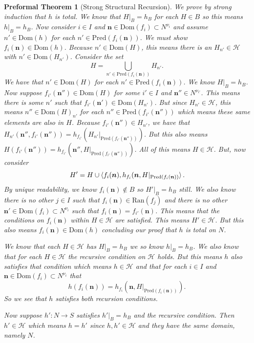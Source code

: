 \documentclass[oneside, 12pt]{book}
\theoremstyle{break}
\newtheorem{preformal definition}[definition]{Preformal Definition}
\newtheorem{preformal theorem}[theorem]{Preformal Theorem}
\newcommand{\bv}[1]{\boldsymbol{#1}}
\newcommand{\mc}[1]{\mathcal{#1}}
\begin{document}
\begin{preformal theorem}[Strong Structural Recursion]
				We prove by strong induction that $h$ is total.
				We know that $H|_B = h_B$ for each $H\in B$ so this means $h|_B = h_B$.
				Now consider $i\in I$ and $\bv{n} \in \text{Dom}(f_i) \subset N^{\nu_i}$ and assume $n' \in \text{Dom}(h)$ for each $n' \in \text{Pred}(f_i(\bv{n}))$.
				We must show $f_i(\bv{n}) \in \text{Dom}(h)$.
				Because $n' \in \text{Dom}(H)$, this means there is an $H_{n'} \in \mc{H}$ with $n' \in \text{Dom}(H_{n'})$.
				Consider the set
				\begin{equation*}
					H = \bigcup_{n' \in \text{Pred}(f_i(\bv{n}))} H_{n'}.
				\end{equation*}
				We have that $n' \in \text{Dom}(H)$ for each $n' \in \text{Pred}(f_i(\bv{n}))$.
				We know $H|_B = h_B$.
				Now suppose $f_{i'}(\bv{n}'') \in \text{Dom}(H)$ for some $i' \in I$ and $\bv{n}'' \in N^{\nu_{i'}}$.
				This means there is some $n'$ such that $f_{i'}(\bv{n}') \in \text{Dom}(H_{n'})$.
				But since $H_{n'} \in \mc{H}$, this means $n'' \in \text{Dom}(H)_{n'}$ for each $n'' \in \text{Pred}(f_{i'}(\bv{n}''))$ which means these same elements are also in $H$.
				Because $f_{i'}(\bv{n}'') \in H_{n'}$, we have that $H_{n'}(\bv{n}'', f_{i'}(\bv{n}'')) = h_{f_{i'}}(H_{n'}|_{\text{Pred}(f_{i'}(\bv{n}''))})$.
				But this also means $H(f_{i'}(\bv{n}'')) = h_{f_{i'}}(\bv{n}'', H|_{\text{Pred}(f_{i'}(\bv{n}''))})$.
				All of this means $H \in \mc{H}$.
				But, now consider
				\begin{equation*}
					H' = H \cup \braket{f_i(\bv{n}), h_{f_i}(\bv{n}, H|_{\text{Pred}(f_i(\bv{n}))}}.
				\end{equation*}
				By unique readability, we know $f_i(\bv{n}) \not \in B$ so $H'|_B = h_B$ still.
				We also know there is no other $j\in I$ such that $f_i(\bv{n}) \in \text{Ran}(f_j)$ and there is no other $\bv{n}' \in \text{Dom}(f_i) \subset N^{\nu_i}$ such that $f_i(\bv{n}) = f_{i'}(\bv{n})$.
				This means that the conditions on $f_i(\bv{n})$ within $H \in \mc{H}$ are satisfied.
				This means $H' \in \mc{H}$.
				But this also means $f_i(\bv{n}) \in \text{Dom}(h)$ concluding our proof that $h$ is total on $N$.
				
				We know that each $H \in \mc{H}$ has $H|_B = h_B$ we so know $h|_B = h_B$.
				We also know that for each $H\in \mc{H}$ the recursive condition on $\mc{H}$ holds.
				But this means $h$ also satisfies that condition which means $h\in \mc{H}$ and that for each $i\in I$ and $\bv{n} \in \text{Dom}(f_i) \subset N^{\nu_i}$ that
				\begin{equation*}
					h(f_i(\bv{n})) = h_{f_i}(\bv{n}, H|_{\text{Pred}(f_i(\bv{n}))}).
				\end{equation*}
				So we see that $h$ satisfies both recursion conditions.
				
				Now suppose $h': N \to S$ satisfies $h'|_B = h_B$ and the recursive condition.
				Then $h' \in \mc{H}$ which means $h = h'$ since $h, h' \in \mc{H}$ and they have the same domain, namely $N$.
			\end{preformal theorem}
		
\end{document}
